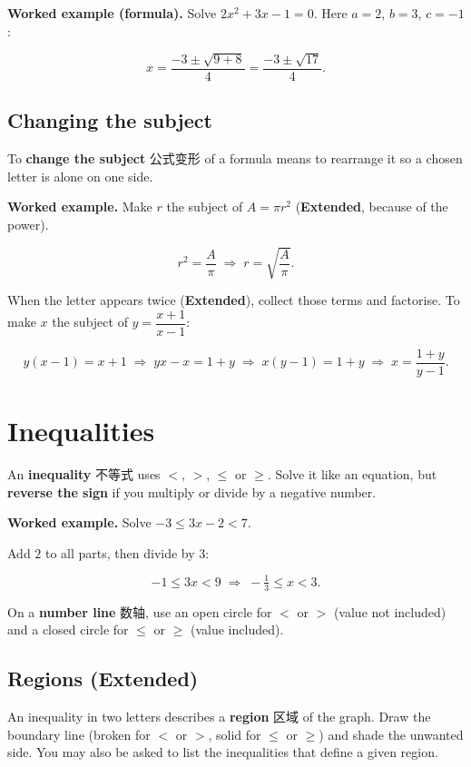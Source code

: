 \documentclass[11pt]{article}
\begin{document}
\textbf{Worked example (formula).} Solve $2x^{2} + 3x - 1 = 0$. Here $a = 2$, $b = 3$, $c = -1$:

\[
x = \frac{-3 \pm \sqrt{9 + 8}}{4} = \frac{-3 \pm \sqrt{17}}{4}.
\]

\subsection*{Changing the subject}

To \textbf{change the subject} 公式变形 of a formula means to rearrange it so a chosen letter is alone on one side.

\textbf{Worked example.} Make $r$ the subject of $A = \pi r^{2}$ (\textbf{Extended}, because of the power).

\[
r^{2} = \frac{A}{\pi} \;\Rightarrow\; r = \sqrt{\frac{A}{\pi}}.
\]

When the letter appears twice (\textbf{Extended}), collect those terms and factorise. To make $x$ the subject of $y = \dfrac{x + 1}{x - 1}$:

\[
y(x - 1) = x + 1 \;\Rightarrow\; yx - x = 1 + y \;\Rightarrow\; x(y - 1) = 1 + y \;\Rightarrow\; x = \frac{1 + y}{y - 1}.
\]

\section*{Inequalities}

An \textbf{inequality} 不等式 uses $<$, $>$, $\leqslant$ or $\geqslant$. Solve it like an equation, but \textbf{reverse the sign} if you multiply or divide by a negative number.

\textbf{Worked example.} Solve $-3 \leqslant 3x - 2 < 7$.

Add $2$ to all parts, then divide by $3$:

\[
-1 \leqslant 3x < 9 \;\Rightarrow\; -\tfrac{1}{3} \leqslant x < 3.
\]

On a \textbf{number line} 数轴, use an open circle for $<$ or $>$ (value not included) and a closed circle for $\leqslant$ or $\geqslant$ (value included).

\subsection*{Regions (Extended)}

An inequality in two letters describes a \textbf{region} 区域 of the graph. Draw the boundary line (broken for $<$ or $>$, solid for $\leqslant$ or $\geqslant$) and shade the unwanted side. You may also be asked to list the inequalities that define a given region.
\end{document}
